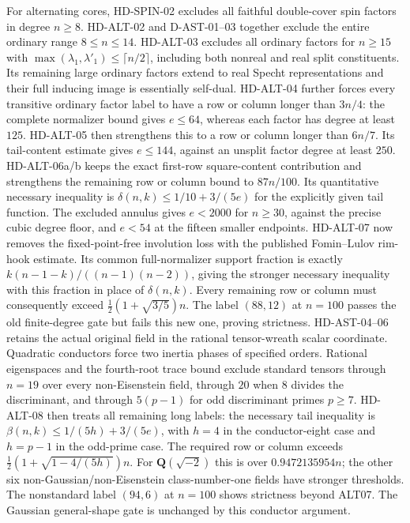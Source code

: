\documentclass[11pt]{article}
\theoremstyle{remark}\newtheorem{remark}[theorem]{Remark}
\begin{document}
For alternating cores, HD-SPIN-02 excludes all faithful double-cover
spin factors in degree $n\ge8$. HD-ALT-02 and D-AST-01--03 together
exclude the entire ordinary range $8\le n\le14$. HD-ALT-03 excludes
all ordinary factors for $n\ge15$ with
$\max(\lambda_1,\lambda'_1)\le\lceil n/2\rceil$, including both
nonreal and real split constituents. Its remaining large ordinary
factors extend to real Specht representations and their full inducing
image is essentially self-dual. HD-ALT-04 further forces every
transitive ordinary factor label to have a row or column longer than
$3n/4$: the complete normalizer bound gives $e\le64$, whereas
each factor has degree at least $125$. HD-ALT-05 then strengthens
this to a row or column longer than $6n/7$. Its tail-content
estimate gives $e\le144$, against an unsplit factor degree
at least $250$. HD-ALT-06a/b keeps the exact first-row square-content
contribution and strengthens the remaining row or column bound to
$87n/100$. Its quantitative necessary inequality is
$\delta(n,k)\le1/10+3/(5e)$ for the explicitly given tail function.
The excluded annulus gives $e<2000$ for $n\ge30$, against the
precise cubic degree floor, and $e<54$ at the fifteen smaller endpoints.
HD-ALT-07 now removes the fixed-point-free involution loss with the
published Fomin--Lulov rim-hook estimate. Its common full-normalizer
support fraction is exactly $k(n-1-k)/((n-1)(n-2))$, giving the stronger
necessary inequality with this fraction in place of $\delta(n,k)$.
Every remaining row or column must consequently exceed
$\tfrac12(1+\sqrt{3/5})n$. The label $(88,12)$ at $n=100$ passes
the old finite-degree gate but fails this new one, proving strictness.
HD-AST-04--06 retains the actual original field in the rational
tensor-wreath scalar coordinate. Quadratic conductors force two inertia
phases of specified orders. Rational eigenspaces and the fourth-root
trace bound exclude standard tensors through $n=19$ over every
non-Eisenstein field, through $20$ when $8$ divides the discriminant,
and through $5(p-1)$ for odd discriminant primes $p\ge7$.
HD-ALT-08 then treats all remaining long labels: the necessary tail
inequality is $\beta(n,k)\le1/(5h)+3/(5e)$, with $h=4$ in the
conductor-eight case and $h=p-1$ in the odd-prime case. The required
row or column exceeds $\tfrac12(1+\sqrt{1-4/(5h)})n$.
For $\mathbf Q(\sqrt{-2})$ this is over $0.9472135954n$;
the other six non-Gaussian/non-Eisenstein class-number-one fields
have stronger thresholds. The nonstandard label $(94,6)$ at $n=100$
shows strictness beyond ALT07. The Gaussian general-shape gate is
unchanged by this conductor argument.
\end{document}

